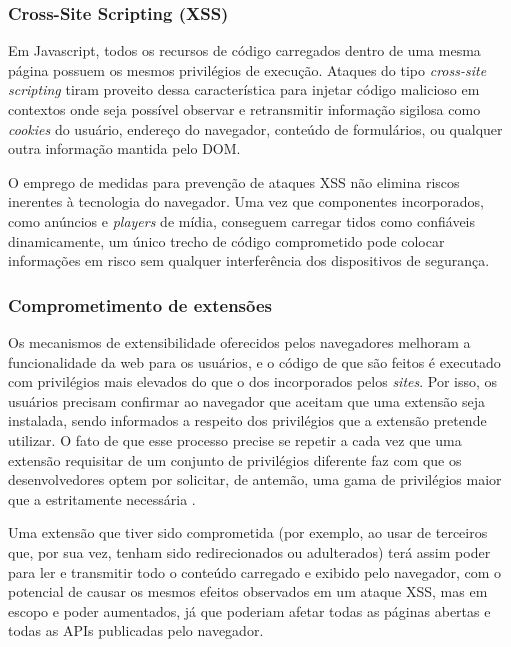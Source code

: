 \subsubsection{Cross-Site Scripting (XSS)}
Em Javascript, todos os recursos de código carregados dentro de uma mesma página possuem os mesmos privilégios de execução. Ataques do tipo \textit{cross-site scripting} tiram proveito dessa característica para injetar código malicioso em contextos onde seja possível observar e retransmitir informação sigilosa como \textit{cookies} do usuário, endereço do navegador, conteúdo de formulários, ou qualquer outra informação mantida pelo DOM.

O emprego de medidas para prevenção de ataques XSS \cite{OWASP:XSS-CheatSheet}  não elimina riscos inerentes à tecnologia do navegador. Uma vez que componentes incorporados, como anúncios e \textit{players} de mídia, conseguem carregar {\scripts} tidos como confiáveis dinamicamente, um único trecho de código comprometido pode colocar informações em risco sem qualquer interferência dos dispositivos de segurança.



\subsubsection{Comprometimento de extensões}
Os mecanismos de extensibilidade oferecidos pelos navegadores melhoram a funcionalidade da web para os usuários, e o código de que são feitos é executado com privilégios mais elevados do que o dos {\scripts} incorporados pelos \textit{sites}. Por isso, os usuários precisam confirmar ao navegador que aceitam que uma extensão seja instalada, sendo informados a respeito dos privilégios que a extensão pretende utilizar. O fato de que esse processo precise se repetir a cada vez que uma extensão requisitar de um conjunto de privilégios diferente faz com que os desenvolvedores optem por solicitar, de antemão, uma gama de privilégios maior que a estritamente necessária \cite{Heule2015_Most_Dangerous_Code}.

Uma extensão que tiver sido comprometida (por exemplo, ao usar {\scripts} de terceiros que, por sua vez, tenham sido redirecionados ou adulterados) terá assim poder para ler e transmitir todo o conteúdo carregado e exibido pelo navegador, com o potencial de causar os mesmos efeitos observados em um ataque XSS, mas em escopo e poder aumentados, já que poderiam afetar todas as páginas abertas e todas as APIs publicadas pelo navegador.

\tbc